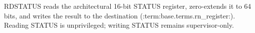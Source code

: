 RDSTATUS reads the architectural 16-bit STATUS register, zero-extends it to 64 bits, and writes the result to the destination (:term:base.terms.rn_register:). Reading STATUS is unprivileged; writing STATUS remains supervisor-only.
